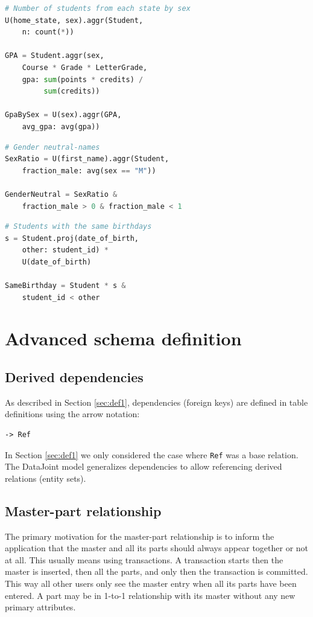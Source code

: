 \documentclass[letter,10pt]{article}
\newcommand{\datajoint}{DataJoint\xspace}
\begin{document}
\begin{lstlisting}[language=Python, morekeywords={avg, U}, caption={Aggregation by a new entity.}, label={lst:u2}]
# Number of students from each state by sex
U(home_state, sex).aggr(Student, 
    n: count(*))

GPA = Student.aggr(sex,
    Course * Grade * LetterGrade,
    gpa: sum(points * credits) /
         sum(credits))

GpaBySex = U(sex).aggr(GPA, 
    avg_gpa: avg(gpa))
\end{lstlisting}

\begin{lstlisting}[language=Python, morekeywords={avg, U}, caption={Aggregation and restriction.}, label={lst:u3}]
# Gender neutral-names
SexRatio = U(first_name).aggr(Student, 
    fraction_male: avg(sex == "M")) 

GenderNeutral = SexRatio & 
    fraction_male > 0 & fraction_male < 1
\end{lstlisting}

\begin{lstlisting}[language=Python, morekeywords={avg, U}, caption={Elevation of a secondary attribute.}, label={lst:u4} ]
# Students with the same birthdays
s = Student.proj(date_of_birth, 
    other: student_id) * 
    U(date_of_birth)

SameBirthday = Student * s & 
    student_id < other
\end{lstlisting}

\section{Advanced schema definition}\label{sec:def2}
\subsection{Derived dependencies}\label{sec:dep}
As described in Section \ref{sec:def1}, dependencies (foreign keys) are defined in table definitions using the arrow notation:
\begin{lstlisting}
-> Ref
\end{lstlisting}
In Section \ref{sec:def1} we only considered the case where \lstinline$Ref$ was a base relation. 
The \datajoint model generalizes dependencies to allow referencing derived relations (entity sets).

\subsection{Master-part relationship}
The primary motivation for the master-part relationship is to inform the application that the master and all its parts should always appear together or not at all.  
This usually means using transactions.  
A transaction starts then the master is inserted, then all the parts, and only then the transaction is committed.  
This way all other users only see the master entry when all its parts have been entered.
A part may be in 1-to-1 relationship with its master without any new primary attributes.
\end{document}
